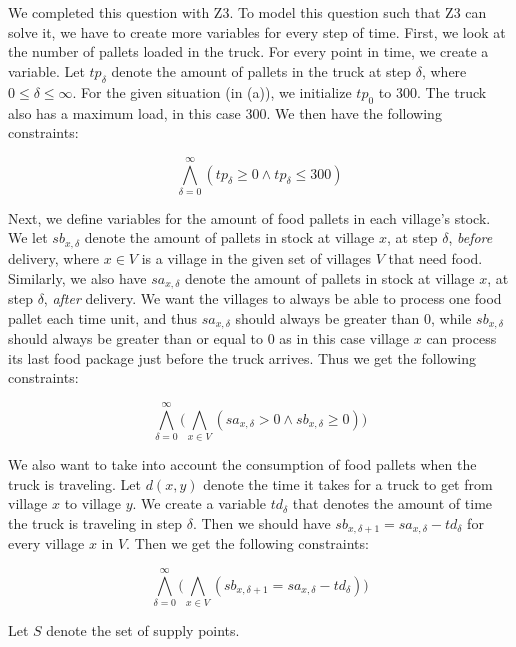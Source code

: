 \chapter{}\label{chp:1}
We completed this question with Z3. To model this question such that Z3 can solve it, we have to create more variables for every step of time. First, we look at the number of pallets loaded in the truck. For every point in time, we create a variable. Let $tp_{\delta}$ denote the amount of pallets in the truck at step $\delta$, where $0 \leq \delta \leq \infty$. For the given situation (in (a)), we initialize $tp_0$ to 300. The truck also has a maximum load, in this case 300. We then have the following constraints:

\begin{equation}
    \label{maxload}
    \bigwedge^{\infty}_{\delta=0} (tp_{\delta} \geq 0 \wedge tp_{\delta} \leq 300)
\end{equation}

Next, we define variables for the amount of food pallets in each village's stock. We let $sb_{x,\delta}$ denote the amount of pallets in stock at village $x$, at step $\delta$, \textit{before} delivery, where $x \in V$ is a village in the given set of villages $V$ that need food. Similarly, we also have $sa_{x,\delta}$ denote the amount of pallets in stock at village $x$, at step $\delta$, \textit{after} delivery. We want the villages to always be able to process one food pallet each time unit, and thus $sa_{x, \delta}$ should always be greater than 0, while $sb_{x, \delta}$ should always be greater than or equal to 0 as in this case village $x$ can process its last food package just before the truck arrives. Thus we get the following constraints:

\begin{equation}
    \label{minfood}
    \bigwedge^{\infty}_{\delta=0}\bigg(\bigwedge_{x \in V} (sa_{x, \delta} > 0 \wedge sb_{x, \delta} \geq 0)\bigg)
\end{equation}

We also want to take into account the consumption of food pallets when the truck is traveling. Let $d(x,y)$ denote the time it takes for a truck to get from village $x$ to village $y$. We create a variable $td_{\delta}$ that denotes the amount of time the truck is traveling in step $\delta$. Then we should have $sb_{x, \delta+1} = sa_{x, \delta} - td_{\delta}$ for every village $x$ in $V$. Then we get the following constraints:

\begin{equation}
    \label{consumption}
    \bigwedge^{\infty}_{\delta=0}\bigg(\bigwedge_{x \in V} (sb_{x, \delta+1} = sa_{x, \delta} - td_{\delta})\bigg)
\end{equation}

Let $S$ denote the set of supply points.